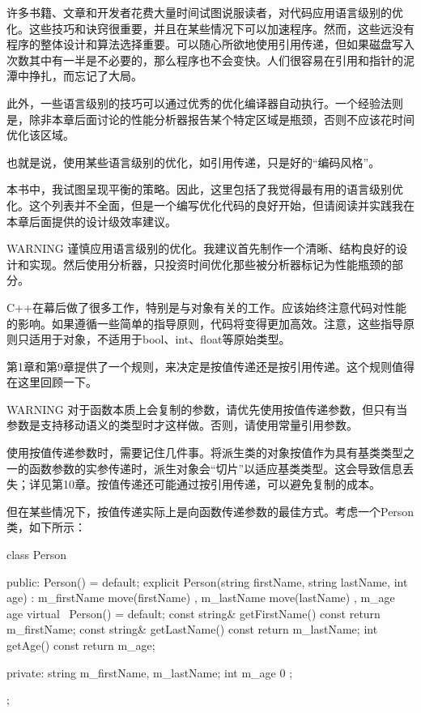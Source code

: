
许多书籍、文章和开发者花费大量时间试图说服读者，对代码应用语言级别的优化。这些技巧和诀窍很重要，并且在某些情况下可以加速程序。然而，这些远没有程序的整体设计和算法选择重要。可以随心所欲地使用引用传递，但如果磁盘写入次数其中有一半是不必要的，那么程序也不会变快。人们很容易在引用和指针的泥潭中挣扎，而忘记了大局。

此外，一些语言级别的技巧可以通过优秀的优化编译器自动执行。一个经验法则是，除非本章后面讨论的性能分析器报告某个特定区域是瓶颈，否则不应该花时间优化该区域。

也就是说，使用某些语言级别的优化，如引用传递，只是好的“编码风格”。

本书中，我试图呈现平衡的策略。因此，这里包括了我觉得最有用的语言级别优化。这个列表并不全面，但是一个编写优化代码的良好开始，但请阅读并实践我在本章后面提供的设计级效率建议。

\begin{myWarning}{WARNING}
谨慎应用语言级别的优化。我建议首先制作一个清晰、结构良好的设计和实现。然后使用分析器，只投资时间优化那些被分析器标记为性能瓶颈的部分。
\end{myWarning}


C++在幕后做了很多工作，特别是与对象有关的工作。应该始终注意代码对性能的影响。如果遵循一些简单的指导原则，代码将变得更加高效。注意，这些指导原则只适用于对象，不适用于bool、int、float等原始类型。


第1章和第9章提供了一个规则，来决定是按值传递还是按引用传递。这个规则值得在这里回顾一下。

\begin{myWarning}{WARNING}
对于函数本质上会复制的参数，请优先使用按值传递参数，但只有当参数是支持移动语义的类型时才这样做。否则，请使用常量引用参数。
\end{myWarning}

使用按值传递参数时，需要记住几件事。将派生类的对象按值作为具有基类类型之一的函数参数的实参传递时，派生对象会“切片”以适应基类类型。这会导致信息丢失；详见第10章。按值传递还可能通过按引用传递，可以避免复制的成本。

但在某些情况下，按值传递实际上是向函数传递参数的最佳方式。考虑一个Person类，如下所示：

\begin{cpp}
class Person
{
    public:
        Person() = default;
        explicit Person(string firstName, string lastName, int age)
            : m_firstName { move(firstName) }, m_lastName { move(lastName) }
            , m_age { age } { }
        virtual ~Person() = default;
        const string& getFirstName() const { return m_firstName; }
        const string& getLastName() const { return m_lastName; }
        int getAge() const { return m_age; }

    private:
        string m_firstName, m_lastName;
        int m_age { 0 };
};
\end{cpp}

